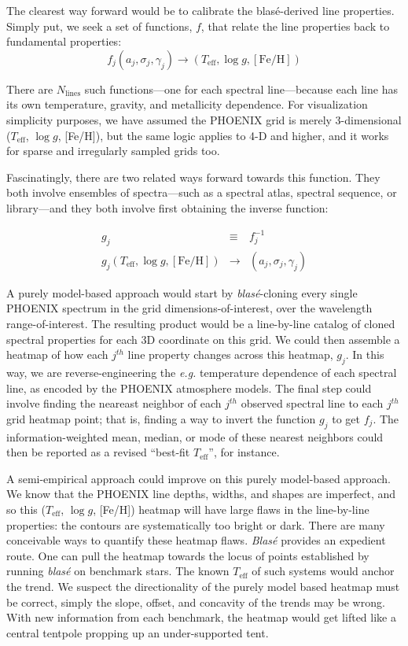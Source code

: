 \documentclass[trackchanges]{aastex631}
\begin{document}
The clearest way forward would be to calibrate the blas\'e-derived line properties.  Simply put, we seek a set of functions, $f$, that relate the line properties back to fundamental properties:
$$f_j(a_j, \sigma_j, \gamma_j) \to (T_\mathrm{eff}, \log{g}, [\mathrm{Fe}/\mathrm{H}])$$

There are $N_{\mathrm{lines}}$ such functions---one for each spectral line---because each line has its own temperature, gravity, and metallicity dependence.  For visualization simplicity purposes, we have assumed the PHOENIX grid is merely 3-dimensional ($T_\mathrm{eff}$, $\log{g}$, [Fe/H]), but the same logic applies to 4-D and higher, and it works for sparse and irregularly sampled grids too.

Fascinatingly, there are two related ways forward towards this function.  They both involve ensembles of spectra---such as a spectral atlas, spectral sequence, or library---and they both involve first obtaining the inverse function:

\begin{eqnarray}
    g_j &\equiv& f^{-1}_j\\
    g_j(T_\mathrm{eff}, \log{g}, [\mathrm{Fe}/\mathrm{H}]) &\to& (a_j, \sigma_j, \gamma_j)
\end{eqnarray}

A purely model-based approach would start by  \emph{blas\'e}-cloning every single PHOENIX spectrum in the grid dimensions-of-interest, over the wavelength range-of-interest.  The resulting product would be a line-by-line catalog of cloned spectral properties for each 3D coordinate on this grid.  We could then assemble a heatmap of how each $j^{th}$ line property changes across this heatmap, $g_j$.  In this way, we are reverse-engineering the \emph{e.g.} temperature dependence of each spectral line, as encoded by the PHOENIX atmosphere models.  The final step could involve finding the neareast neighbor of each $j^{th}$ observed spectral line to each $j^{th}$ grid heatmap point; that is, finding a way to invert the function $g_j$ to get $f_j$.  The information-weighted mean, median, or mode of these nearest neighbors could then be reported as a revised ``best-fit $T_\mathrm{eff}$'', for instance.

A semi-empirical approach could improve on this purely model-based approach.  We know that the PHOENIX line depths, widths, and shapes are imperfect, and so this ($T_\mathrm{eff}$, $\log{g}$, [Fe/H]) heatmap will have large flaws in the line-by-line properties: the contours are systematically too bright or dark.  There are many conceivable ways to quantify these heatmap flaws.   \emph{Blas\'e} provides an expedient route.  One can pull the heatmap towards the locus of points established by running  \emph{blas\'e} on benchmark stars.  The known $T_\mathrm{eff}$ of such systems would anchor the trend.  We suspect the directionality of the purely model based heatmap must be correct, simply the slope, offset, and concavity of the trends may be wrong. With new information from each benchmark, the heatmap would get lifted like a central tentpole propping up an under-supported tent.
\end{document}
